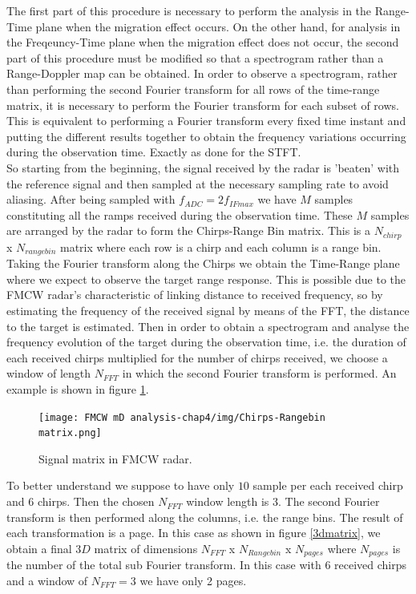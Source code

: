 The first part of this procedure is necessary to perform the analysis in the Range-Time plane when the migration effect occurs. On the other hand, for analysis in the Freqeuncy-Time plane when the migration effect does not occur, the second part of this procedure must be modified so that a spectrogram rather than a Range-Doppler map can be obtained. In order to observe a spectrogram, rather than performing the second Fourier transform for all rows of the time-range matrix, it is necessary to perform the Fourier transform for each subset of rows. This is equivalent to performing a Fourier transform every fixed time instant and putting the different results together to obtain the frequency variations occurring during the observation time. Exactly as done for the STFT.\\
So starting from the beginning, the signal received by the radar is 'beaten' with the reference signal and then sampled at the necessary sampling rate to avoid aliasing. 
After being sampled with $f_{ADC} = 2 f_{IFmax}$ we have $M$ samples constituting all the ramps received during the observation time. These $M$ samples are arranged by the radar to form the Chirps-Range Bin matrix. This is a $N_{chirp}$ x $N_{range bin}$ matrix where each row is a chirp and each column is a range bin. Taking the Fourier transform along the Chirps we obtain the Time-Range plane where we expect to observe the target range response. This is possible due to the FMCW radar's characteristic of linking distance to received frequency, so by estimating the frequency of the received signal by means of the FFT, the distance to the target is estimated. Then in order to obtain a spectrogram and analyse the frequency evolution of the target during the observation time, i.e. the duration of each received chirps multiplied for the number of chirps received, we choose a window of length $N_{FFT}$ in which the second Fourier transform is performed. An example is shown in figure \ref{1dmatrix}.

\begin{figure}[h!]
\centering
\texttt{[image: FMCW mD analysis-chap4/img/Chirps-Rangebin matrix.png]}
\caption{Signal matrix in FMCW radar.}
\label{1dmatrix}
\end{figure}

To better understand we suppose to have only $10$ sample per each received chirp and $6$ chirps. Then the chosen $N_{FFT}$ window length is 3. The second Fourier transform is then performed along the columns, i.e. the range bins. The result of each transformation is a page. In this case as shown in figure \ref{3dmatrix}, we obtain a final $3D$ matrix of dimensions $N_{FFT}$ x $N_{Range bin}$ x $N_{pages}$ where $N_{pages}$ is the number of the total sub Fourier transform. In this case with $6$ received chirps and a window of $N_{FFT} = 3$ we have only 2 pages.

